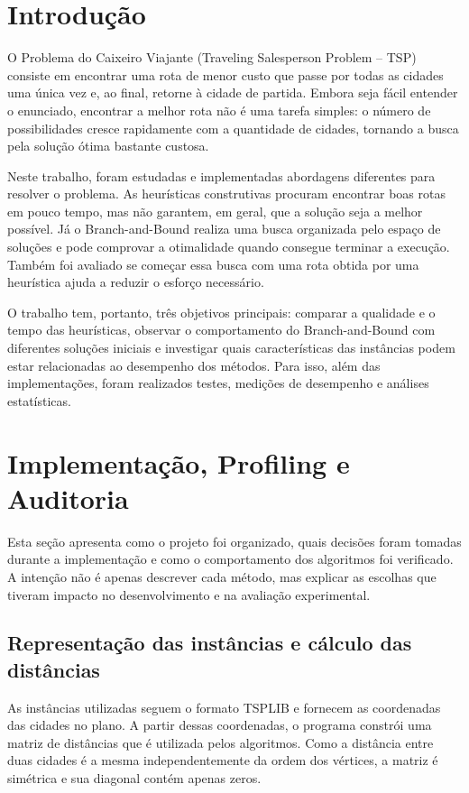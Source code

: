\documentclass[12pt]{article}
\begin{document}
\section{Introdução}

O Problema do Caixeiro Viajante (Traveling Salesperson Problem -- TSP) consiste em encontrar uma rota de menor custo que passe por todas as cidades uma única vez e, ao final, retorne à cidade de partida. Embora seja fácil entender o enunciado, encontrar a melhor rota não é uma tarefa simples: o número de possibilidades cresce rapidamente com a quantidade de cidades, tornando a busca pela solução ótima bastante custosa.

Neste trabalho, foram estudadas e implementadas abordagens diferentes para resolver o problema. As heurísticas construtivas procuram encontrar boas rotas em pouco tempo, mas não garantem, em geral, que a solução seja a melhor possível. Já o Branch-and-Bound realiza uma busca organizada pelo espaço de soluções e pode comprovar a otimalidade quando consegue terminar a execução. Também foi avaliado se começar essa busca com uma rota obtida por uma heurística ajuda a reduzir o esforço necessário.

O trabalho tem, portanto, três objetivos principais: comparar a qualidade e o tempo das heurísticas, observar o comportamento do Branch-and-Bound com diferentes soluções iniciais e investigar quais características das instâncias podem estar relacionadas ao desempenho dos métodos. Para isso, além das implementações, foram realizados testes, medições de desempenho e análises estatísticas.

\section{Implementação, Profiling e Auditoria}

Esta seção apresenta como o projeto foi organizado, quais decisões foram tomadas durante a implementação e como o comportamento dos algoritmos foi verificado. A intenção não é apenas descrever cada método, mas explicar as escolhas que tiveram impacto no desenvolvimento e na avaliação experimental.

\subsection{Representação das instâncias e cálculo das distâncias}

As instâncias utilizadas seguem o formato TSPLIB e fornecem as coordenadas das cidades no plano. A partir dessas coordenadas, o programa constrói uma matriz de distâncias que é utilizada pelos algoritmos. Como a distância entre duas cidades é a mesma independentemente da ordem dos vértices, a matriz é simétrica e sua diagonal contém apenas zeros.
\end{document}
